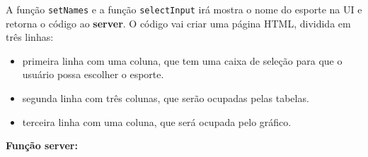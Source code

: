 \documentclass[
]{book}
\newenvironment{Shaded}{\begin{snugshade}}{\end{snugshade}}
\newcommand{\AttributeTok}[1]{\textcolor[rgb]{0.77,0.63,0.00}{#1}}
\newcommand{\DecValTok}[1]{\textcolor[rgb]{0.00,0.00,0.81}{#1}}
\newcommand{\FunctionTok}[1]{\textcolor[rgb]{0.00,0.00,0.00}{#1}}
\newcommand{\NormalTok}[1]{#1}
\newcommand{\OtherTok}[1]{\textcolor[rgb]{0.56,0.35,0.01}{#1}}
\newcommand{\SpecialCharTok}[1]{\textcolor[rgb]{0.00,0.00,0.00}{#1}}
\newcommand{\StringTok}[1]{\textcolor[rgb]{0.31,0.60,0.02}{#1}}
\providecommand{\tightlist}{%
  \setlength{\itemsep}{0pt}\setlength{\parskip}{0pt}}
\begin{document}
\begin{Shaded}
\end{Shaded}

A função \texttt{setNames} e a função \texttt{selectInput} irá mostra o nome do esporte na UI e retorna o código ao \textbf{server}. O código vai criar uma página HTML, dividida em três linhas:

\begin{itemize}
\tightlist
\item
  primeira linha com uma coluna, que tem uma caixa de seleção para que o usuário possa escolher o esporte.
\item
  segunda linha com três colunas, que serão ocupadas pelas tabelas.
\item
  terceira linha com uma coluna, que será ocupada pelo gráfico.
\end{itemize}

\textbf{Função server:}
\end{document}

